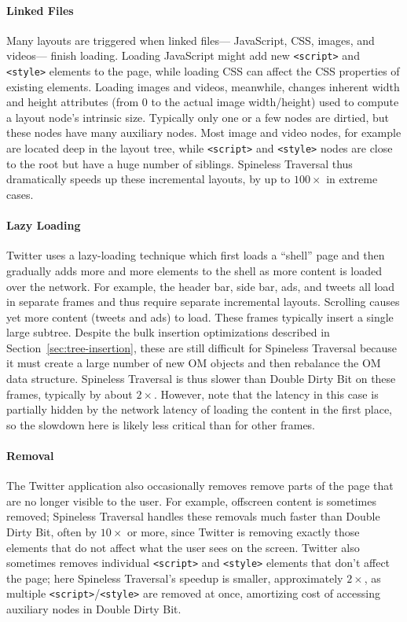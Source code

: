 \paragraph{Linked Files}
Many layouts are triggered when linked files---%
  JavaScript, CSS, images, and videos---%
  finish loading.
Loading JavaScript might add
  new \texttt{<script>} and \texttt{<style>} elements to the page,
  while loading CSS can affect the CSS properties
  of existing elements.
Loading images and videos, meanwhile,
  changes inherent width and height attributes
  (from 0 to the actual image width/height)
  used to compute a layout node's intrinsic size.
Typically only one or a few nodes are dirtied,
  but these nodes have many auxiliary nodes.
Most image and video nodes, for example
  are located deep in the layout tree,
  while \texttt{<script>} and \texttt{<style>} nodes
  are close to the root but have a huge number of siblings.
Spineless Traversal thus dramatically speeds up
  these incremental layouts,
  by up to $100\times$ in extreme cases.
 
\paragraph{Lazy Loading}
Twitter uses a lazy-loading technique
  which first loads a ``shell'' page
  and then gradually adds more and more elements to the shell
  as more content is loaded over the network.
For example, the header bar, side bar, ads, and tweets
  all load in separate frames and thus require
  separate incremental layouts.
Scrolling causes yet more content (tweets and ads) to load.
These frames typically insert a single large subtree.
Despite the bulk insertion optimizations
  described in Section~\ref{sec:tree-insertion},
  these are still difficult for Spineless Traversal
  because it must create a large number of new OM objects
  and then rebalance the OM data structure.
Spineless Traversal is thus slower than Double Dirty Bit on these frames,
  typically by about $2\times$.
However, note that the latency in this case is partially hidden
  by the network latency of loading the content in the first place,
  so the slowdown here is likely less critical than for other frames.

\paragraph{Removal}
The Twitter application also occasionally removes
  remove parts of the page that are no longer visible to the user.
For example, offscreen content is sometimes removed;
  Spineless Traversal handles these removals
  much faster than Double Dirty Bit,
  often by $10\times$ or more,
  since Twitter is removing exactly those elements
  that do not affect what the user sees on the screen.
Twitter also sometimes removes
  individual \texttt{<script>} and \texttt{<style>} elements
  that don't affect the page;
  here Spineless Traversal's speedup
  is smaller, approximately $2\times$,
  as multiple \texttt{<script>}/\texttt{<style>} are removed at once,
  amortizing cost of accessing auxiliary nodes in Double Dirty Bit. 

